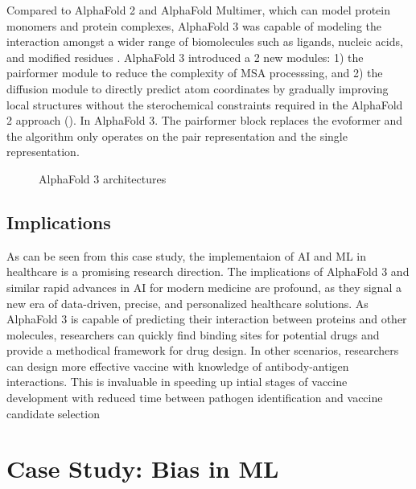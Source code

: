 \documentclass[a4paper]{article}
\begin{document}
Compared to AlphaFold 2 and AlphaFold Multimer, which can model protein monomers and protein complexes, AlphaFold 3 was capable of modeling the interaction amongst a wider range of biomolecules such as ligands, nucleic acids, and modified residues \cite{abramson_accurate_2024}. AlphaFold 3 introduced a  2 new modules: 1) the pairformer module to reduce the complexity of MSA processsing, and 2) the diffusion module to directly predict atom coordinates by gradually improving local structures without the sterochemical constraints required in the AlphaFold 2 approach (). In AlphaFold 3. 
The pairformer block replaces the evoformer and the algorithm only operates on the pair representation and the single representation.

\begin{figure}[h]
    \caption{AlphaFold 3 architectures} 
    \label{fig:AlphaFold3_Architecture}
\end{figure}

\subsection{Implications}
As can be seen from this case study, the implementaion of AI and ML in healthcare is a promising research direction. The implications of AlphaFold 3 and similar rapid advances in AI for modern medicine are profound, as they signal a new era of data-driven, precise, and personalized healthcare solutions. As AlphaFold 3 is capable of predicting their interaction between proteins and other molecules, researchers can quickly find binding sites for potential drugs and provide a methodical framework for drug design. In other scenarios, researchers can design more effective vaccine with knowledge of antibody-antigen interactions. This is invaluable in speeding up intial stages of vaccine development with reduced time between pathogen identification and vaccine candidate selection  




\section{Case Study: Bias in ML}
\end{document}
